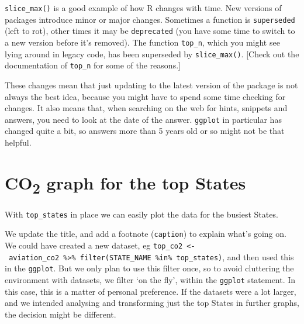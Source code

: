 \documentclass[
]{book}
\begin{document}
\texttt{slice\_max()} is a good example of how R changes with time. New versions of packages introduce minor or major changes. Sometimes a function is \texttt{superseded} (left to rot), other times it may be \texttt{deprecated} (you have some time to switch to a new version before it's removed). The function \texttt{top\_n}, which you might see lying around in legacy code, has been superseded by \texttt{slice\_max()}. {[}Check out the documentation of \texttt{top\_n} for some of the reasons.{]}

These changes mean that just updating to the latest version of the package is not always the best idea, because you might have to spend some time checking for changes. It also means that, when searching on the web for hints, snippets and answers, you need to look at the date of the answer. \texttt{ggplot} in particular has changed quite a bit, so answers more than 5 years old or so might not be that helpful.

\hypertarget{co2-graph-for-the-top-states}{%
\section{\texorpdfstring{CO\textsubscript{2} graph for the top States}{CO2 graph for the top States}}\label{co2-graph-for-the-top-states}}

With \texttt{top\_states} in place we can easily plot the data for the busiest States.

We update the title, and add a footnote (\texttt{caption}) to explain what's going on. We could have created a new dataset, eg \texttt{top\_co2\ \textless{}-\ aviation\_co2\ \%\textgreater{}\%\ filter(STATE\_NAME\ \%in\%\ top\_states)}, and then used this in the \texttt{ggplot}. But we only plan to use this filter once, so to avoid cluttering the environment with datasets, we filter `on the fly', within the \texttt{ggplot} statement. In this case, this is a matter of personal preference. If the datasets were a lot larger, and we intended analysing and transforming just the top States in further graphs, the decision might be different.
\end{document}
